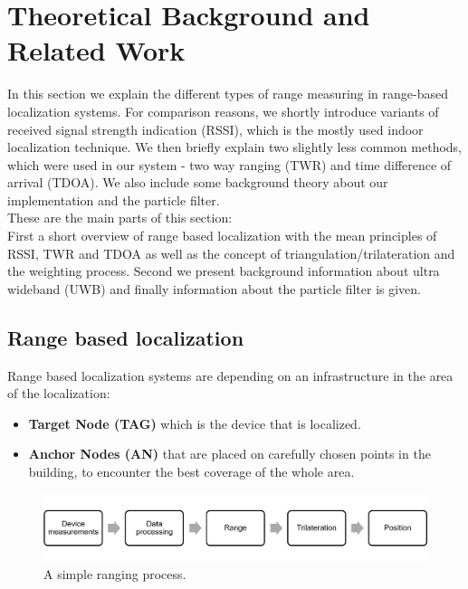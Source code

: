
\chapter{Theoretical Background and Related Work} %

\label{Chapter2} %
In this section we explain the different types of range measuring in range-based localization systems. For comparison reasons, we shortly introduce variants of received signal strength indication (RSSI), which is the mostly used indoor localization technique. We then briefly explain two slightly less common methods, which were used in our system - two way ranging (TWR) and time difference of arrival (TDOA). We also include some background theory about our implementation and the particle filter.\\
These are the main parts of this section:\\
First a short overview of range based localization with the mean principles of RSSI, TWR and TDOA as well as the concept of triangulation/trilateration and the weighting process. Second we present background information about ultra wideband (UWB) and finally information about the particle filter is given.


\section{Range based localization}

Range based localization systems are depending on an infrastructure in the area of the localization:
\begin{itemize} 
\item \textbf{Target Node (TAG)} which is the device that is localized. 
\item \textbf{Anchor Nodes (AN)} that are placed on carefully chosen points in the building, to encounter the best coverage of the whole area.
\end{itemize}

\begin{figure}[th]
\centering
\includegraphics[width=1.0\textwidth]{Figures/ranging_process}
\decoRule
\caption[Ranging process]{A simple ranging process.}
\label{fig:ranging_process}
\end{figure}

